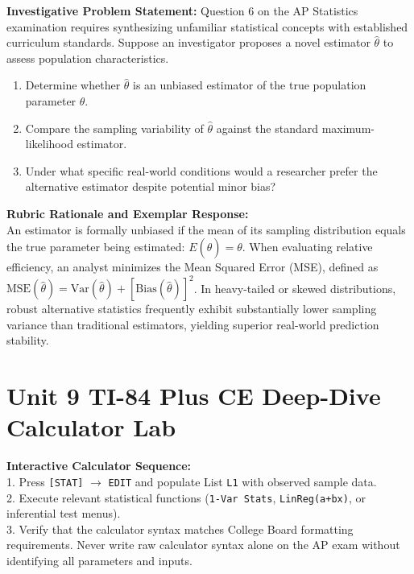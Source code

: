 \begin{frqrubricbox}
\textbf{Investigative Problem Statement:} Question 6 on the AP Statistics examination requires synthesizing unfamiliar statistical concepts with established curriculum standards. Suppose an investigator proposes a novel estimator $\hat{\theta}$ to assess population characteristics.
\begin{enumerate}[label=(\alph*)]
  \item Determine whether $\hat{\theta}$ is an unbiased estimator of the true population parameter $\theta$.
  \item Compare the sampling variability of $\hat{\theta}$ against the standard maximum-likelihood estimator.
  \item Under what specific real-world conditions would a researcher prefer the alternative estimator despite potential minor bias?
\end{enumerate}
\textbf{Rubric Rationale and Exemplar Response:}\\
An estimator is formally unbiased if the mean of its sampling distribution equals the true parameter being estimated: $E(\hat{\theta}) = \theta$. When evaluating relative efficiency, an analyst minimizes the Mean Squared Error (MSE), defined as $\text{MSE}(\hat{\theta}) = \text{Var}(\hat{\theta}) + [\text{Bias}(\hat{\theta})]^2$. In heavy-tailed or skewed distributions, robust alternative statistics frequently exhibit substantially lower sampling variance than traditional estimators, yielding superior real-world prediction stability.
\end{frqrubricbox}\vspace{6pt}
\section{Unit 9 TI-84 Plus CE Deep-Dive Calculator Lab}
\begin{calculatorbox}
\textbf{Interactive Calculator Sequence:}\\
1. Press \texttt{[STAT]} $\rightarrow$ \texttt{EDIT} and populate List \texttt{L1} with observed sample data.\\
2. Execute relevant statistical functions (\texttt{1-Var Stats}, \texttt{LinReg(a+bx)}, or inferential test menus).\\
3. Verify that the calculator syntax matches College Board formatting requirements. Never write raw calculator syntax alone on the AP exam without identifying all parameters and inputs.
\end{calculatorbox}\vspace{10pt}
